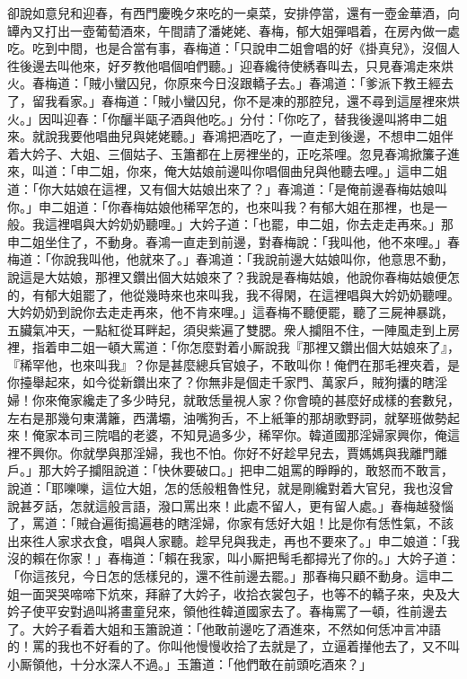 卻說如意兒和迎春，有西門慶晚夕來吃的一桌菜，安排停當，還有一壺金華酒，{}向罈內又打出一壺葡萄酒來，午間請了潘姥姥、春梅，郁大姐彈唱着，在房內做一處吃。吃到中間，也是合當有事，春梅道：「只說申二姐會唱的好《掛真兒》，沒個人徃後邊去叫他來，好歹教他唱個咱們聽。」迎春纔待使綉春叫去，只見春鴻走來烘火。春梅道：「賊小蠻囚兒，你原來今日沒跟轎子去。」春鴻道：「爹派下教王經去了，留我看家。」春梅道：「賊小蠻囚兒，你不是凍的那腔兒，還不尋到這屋裡來烘火。」因叫迎春：「你釃半甌子酒與他吃。」分付：「你吃了，替我後邊叫將申二姐來。就說我要他唱曲兒與姥姥聽。」春鴻把酒吃了，一直走到後邊，不想申二姐伴着大妗子、大姐、三個姑子、玉簫都在上房裡坐的，正吃茶哩。忽見春鴻掀簾子進來，叫道：「申二姐，你來，俺大姑娘前邊叫你唱個曲兒與他聽去哩。」這申二姐道：「你大姑娘在這裡，又有個大姑娘出來了？」春鴻道：「是俺前邊春梅姑娘叫你。」申二姐道：「你春梅姑娘他稀罕怎的，也來叫我？有郁大姐在那裡，也是一般。我這裡唱與大妗奶奶聽哩。」大妗子道：「也罷，申二姐，你去走走再來。」那申二姐坐住了，不動身。{}春鴻一直走到前邊，對春梅說：「我叫他，他不來哩。」春梅道：「你說我叫他，他就來了。」春鴻道：「我說前邊大姑娘叫你，他意思不動，說這是大姑娘，那裡又鑽出個大姑娘來了？我說是春梅姑娘，他說你春梅姑娘便怎的，有郁大姐罷了，他從幾時來也來叫我，我不得閑，在這裡唱與大妗奶奶聽哩。大妗奶奶到說你去走走再來，他不肯來哩。」這春梅不聽便罷，聽了三屍神暴跳，五臟氣冲天，一點紅從耳畔起，須臾紫遍了雙腮。衆人攔阻不住，一陣風走到上房裡，指着申二姐一頓大罵道：「你怎麼對着小厮說我『那裡又鑽出個大姑娘來了』，『稀罕他，也來叫我』？你是甚麼總兵官娘子，不敢叫你！俺們在那毛裡夾着，是你擡舉起來，如今從新鑽出來了？你無非是個走千家門、萬家戶，賊狗攮的瞎淫婦！你來俺家纔走了多少時兒，就敢恁量視人家？你會曉的甚麼好成樣的套數兒，左右是那幾句東溝籬，西溝壩，油嘴狗舌，不上紙筆的那胡歌野詞，就拏班做勢起來！俺家本司三院唱的老婆，不知見過多少，稀罕你。韓道國那淫婦家興你，俺這裡不興你。{}你就學與那淫婦，我也不怕。你好不好趁早兒去，賈媽媽與我離門離戶。」那大妗子攔阻說道：「快休要破口。」把申二姐罵的睜睜的，敢怒而不敢言，說道：「耶嚛嚛，這位大姐，怎的恁般粗魯性兒，就是剛纔對着大官兒，我也沒曾說甚歹話，怎就這般言語，潑口罵出來！此處不留人，更有留人處。」春梅越發惱了，罵道：「賊㒲遍街搗遍巷的瞎淫婦，你家有恁好大姐！比是你有恁性氣，不該出來徃人家求衣食，唱與人家聽。趁早兒與我走，再也不要來了。」申二娘道：「我沒的賴在你家！」春梅道：「賴在我家，叫小厮把髩毛都撏光了你的。」{}大妗子道：「你這孩兒，今日怎的恁樣兒的，還不徃前邊去罷。」那春梅只顧不動身。這申二姐一面哭哭啼啼下炕來，拜辭了大妗子，收拾衣裳包子，也等不的轎子來，央及大妗子使平安對過叫將畫童兒來，領他徃韓道國家去了。春梅罵了一頓，徃前邊去了。大妗子看着大姐和玉簫說道：「他敢前邊吃了酒進來，不然如何恁冲言冲語的！罵的我也不好看的了。你叫他慢慢收拾了去就是了，立逼着攆他去了，又不叫小厮領他，十分水深人不過。」玉簫道：「他們敢在前頭吃酒來？」

